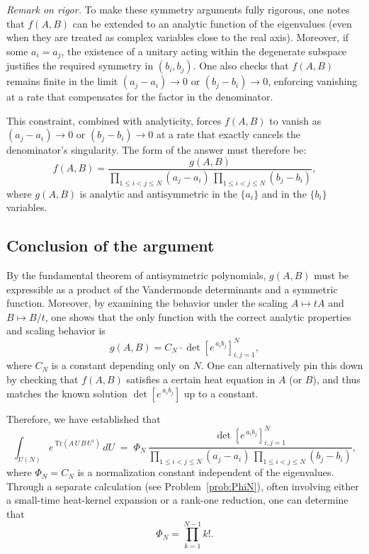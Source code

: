 \documentclass[letterpaper,11pt,oneside,reqno]{article}
\numberwithin{equation}{section}
\theoremstyle{definition}
\begin{document}
\textit{Remark on rigor.}
To make these symmetry arguments fully rigorous, one notes that $f(A,B)$ can be extended to an analytic function of the eigenvalues (even when they are treated as complex variables close to the real axis). Moreover, if some $a_i = a_j$, the existence of a unitary acting within the degenerate subspace justifies the required symmetry in $(b_i,b_j)$. One also checks that $f(A,B)$ remains finite in the limit $(a_j-a_i)\to 0$ or $(b_j-b_i)\to 0$, enforcing vanishing at a rate that compensates for the factor in the denominator.

This constraint, combined with analyticity, forces $f(A,B)$ to vanish as $(a_j-a_i) \to 0$ or $(b_j-b_i) \to 0$ at a rate that exactly cancels the denominator's singularity. The form of the answer must therefore be:
\[
   f(A,B) = \frac{g(A,B)}{\prod_{1\le i<j\le N}(a_j-a_i)\,\prod_{1\le i<j\le N}(b_j-b_i)},
\]
where $g(A,B)$ is analytic and antisymmetric in the $\{a_i\}$ and in the $\{b_i\}$ variables.

\subsection{Conclusion of the argument}

By the fundamental theorem of antisymmetric polynomials, $g(A,B)$ must be expressible as a product of the Vandermonde determinants and a symmetric function. Moreover, by examining the behavior under the scaling $A \mapsto tA$ and $B \mapsto B/t$, one shows that the only function with the correct analytic properties and scaling behavior is
\[
   g(A,B) = C_N \cdot \det[e^{\,a_i b_j}]_{i,j=1}^N,
\]
where $C_N$ is a constant depending only on $N$. One can alternatively pin this down by checking that $f(A,B)$ satisfies a certain heat equation in $A$ (or $B$), and thus matches the known solution $\det[e^{\,a_i b_j}]$ up to a constant.

Therefore, we have established that
\[
   \int_{U(N)} e^{\,\mathrm{Tr}(A\,U\,B\,U^\dagger)}\,dU
   \;=\;
   \Phi_N
   \,\frac{\det[e^{\,a_i b_j}]_{i,j=1}^N}{\prod_{1\le i<j\le N}(a_j-a_i)\,\prod_{1\le i<j\le N}(b_j-b_i)},
\]
where $\Phi_N = C_N$ is a normalization constant independent
of the eigenvalues. Through a separate calculation
(see Problem~\ref{prob:PhiN}), often
involving either a small-time heat-kernel expansion or a
rank-one reduction, one can determine that
\begin{equation}
	\label{eq:PhiN}
   \Phi_N = \prod_{k=1}^{N-1} k!.
 \end{equation}
\end{document}

